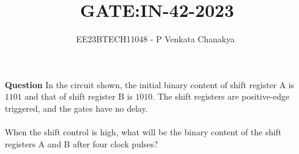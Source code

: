 \documentclass[journal,12pt,onecolumn]{IEEEtran}
\theoremstyle{remark}
\begin{document}

\vspace{3cm}

\title{GATE:IN-42-2023}
\author{EE23BTECH11048 - P Venkata Chanakya $^{}$%
}
\maketitle
\bigskip



\textbf{Question}
In the circuit shown, the initial binary content of shift register A is $1101$ and that of shift register B is $1010$. The shift registers are positive-edge triggered, and the gates have no delay.\\
\\
When the shift control is high, what will be the binary content of the shift registers A and B after four clock pulses?\\
\end{document}
